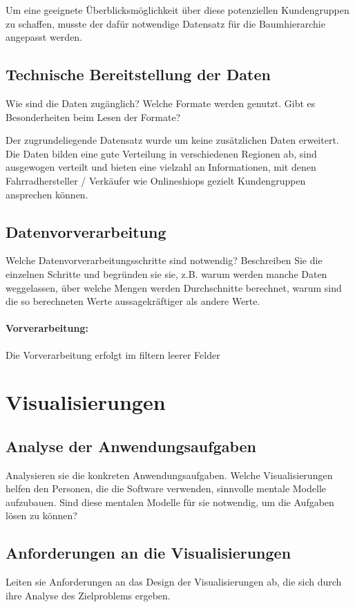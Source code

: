 \documentclass[usegeometry=true]{scrartcl}
\begin{document}
Um eine geeignete Überblicksmöglichkeit über diese potenziellen Kundengruppen zu schaffen, musste der dafür notwendige Datensatz für die Baumhierarchie angepasst werden. 

\subsection{Technische Bereitstellung der Daten}
Wie sind die Daten zugänglich? Welche Formate werden genutzt. Gibt es Besonderheiten beim Lesen der Formate?



Der zugrundeliegende Datensatz wurde um keine zusätzlichen Daten erweitert. Die Daten bilden eine gute Verteilung in verschiedenen Regionen ab, sind ausgewogen verteilt und bieten eine vielzahl an Informationen, mit denen Fahrradhersteller / Verkäufer wie Onlineshiops gezielt Kundengruppen ansprechen können. 
\subsection{Datenvorverarbeitung}
Welche Datenvorverarbeitungsschritte sind notwendig? Beschreiben Sie die einzelnen Schritte und begründen sie sie, z.B. warum werden manche Daten weggelassen, über welche Mengen werden Durchschnitte berechnet, warum sind die so berechneten Werte aussagekräftiger als andere Werte. 

\paragraph{Vorverarbeitung:} Die Vorverarbeitung erfolgt im filtern leerer Felder

\section{Visualisierungen}
\subsection{Analyse der Anwendungsaufgaben}
Analysieren sie die konkreten Anwendungsaufgaben. Welche Visualisierungen helfen den Personen, die die Software verwenden, sinnvolle mentale Modelle aufzubauen. Sind diese mentalen Modelle für sie notwendig, um die Aufgaben lösen zu können?
\subsection{Anforderungen an die Visualisierungen}
Leiten sie Anforderungen an das Design der Visualisierungen ab, die sich durch ihre Analyse des Zielproblems ergeben.
\end{document}
